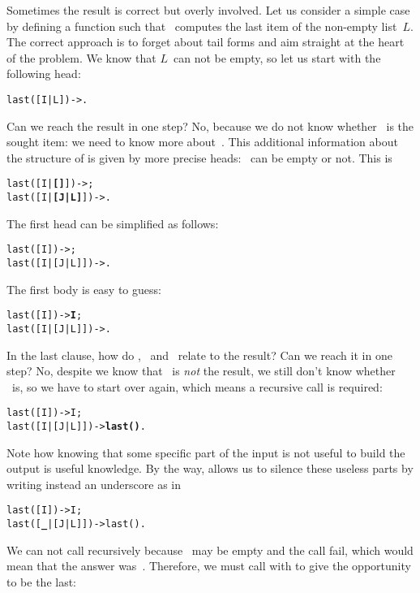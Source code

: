 Sometimes the result is correct but overly involved. Let us consider a
simple case by defining a function  such that
~computes the last item of the non\hyp{}empty
list~\(L\). The correct approach is to forget about tail forms and aim
straight at the heart of the problem. We know that \(L\)~can not be
empty, so let us start with the following head:
\begin{alltt}
last([I|L]) -> .
\end{alltt}
Can we reach the result in one step? No, because we do not know
whether ~is the sought item: we need to know more
about~. This additional information about the structure of
 is given by more precise heads: ~can be empty
or not. This is
\begin{alltt}
last([I|   \textbf{[]}]) -> ;
last([I|\textbf{[J|L]}]) -> .
\end{alltt}
The first head can be simplified as follows:
\begin{alltt}
last(      [I]) -> ;
last([I|[J|L]]) -> .
\end{alltt}
The first body is easy to guess:
\begin{alltt}
last(      [I]) -> \textbf{I};
last([I|[J|L]]) -> .
\end{alltt}
In the last clause, how do , ~and~
relate to the result? Can we reach it in one step? No, despite we know
that ~is \emph{not} the result, we still don't know whether
~is, so we have to start over again, which means a
recursive call is required:
\begin{alltt}
last(      [I]) -> I;
last([I|[J|L]]) -> \textbf{last(}\fbcode{[J|L]}\textbf{)}.\hfill% I \emph{is useless}
\end{alltt}
Note how knowing that some specific part of the input is not useful to
build the output is useful knowledge. By the way, \Erlang allows us to
silence these useless parts by writing instead an underscore as in
\begin{alltt}
last(      [I]) -> I;
last([\textbf{\_}|[J|L]]) -> last(\fbcode{[J|L]}).\hfill% \emph{Anonymous list head}
\end{alltt}
We can not call recursively  because ~may
be empty and the call fail, which would mean that the answer
was~. Therefore, we must call with \erlcode{[J|L]} to give
 the opportunity to be the last:
